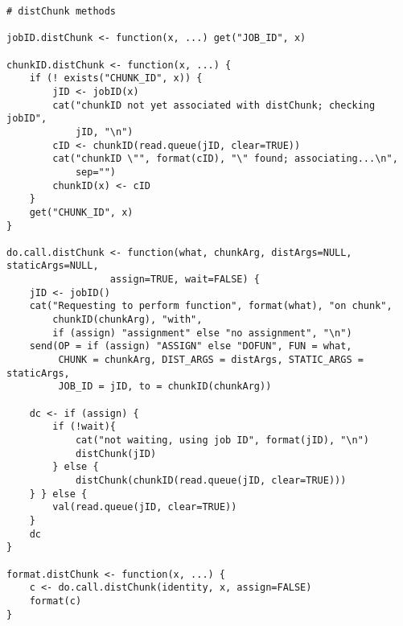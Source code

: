 \hypertarget{lst:wo-ass-chunk}{%
\label{lst:wo-ass-chunk}}%
\begin{verbatim}
# distChunk methods

jobID.distChunk <- function(x, ...) get("JOB_ID", x)

chunkID.distChunk <- function(x, ...) {
    if (! exists("CHUNK_ID", x)) {
        jID <- jobID(x)
        cat("chunkID not yet associated with distChunk; checking jobID",
            jID, "\n")
        cID <- chunkID(read.queue(jID, clear=TRUE))
        cat("chunkID \"", format(cID), "\" found; associating...\n",
            sep="")
        chunkID(x) <- cID
    }
    get("CHUNK_ID", x)
}

do.call.distChunk <- function(what, chunkArg, distArgs=NULL, staticArgs=NULL,
                  assign=TRUE, wait=FALSE) {
    jID <- jobID()
    cat("Requesting to perform function", format(what), "on chunk",
        chunkID(chunkArg), "with",
        if (assign) "assignment" else "no assignment", "\n")
    send(OP = if (assign) "ASSIGN" else "DOFUN", FUN = what,
         CHUNK = chunkArg, DIST_ARGS = distArgs, STATIC_ARGS = staticArgs,
         JOB_ID = jID, to = chunkID(chunkArg))

    dc <- if (assign) {
        if (!wait){
            cat("not waiting, using job ID", format(jID), "\n")
            distChunk(jID)
        } else {
            distChunk(chunkID(read.queue(jID, clear=TRUE)))
    } } else {
        val(read.queue(jID, clear=TRUE))
    }
    dc
}

format.distChunk <- function(x, ...) {
    c <- do.call.distChunk(identity, x, assign=FALSE)
    format(c)
}
\end{verbatim}

